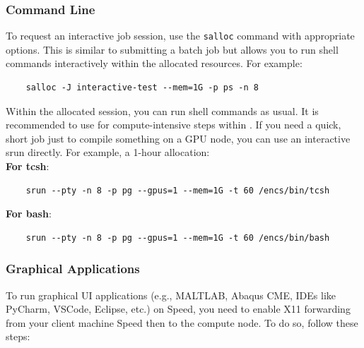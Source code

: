 \subsubsection{Command Line}
\label{sect:command-line}

To request an interactive job session, use the \texttt{salloc} command with appropriate options.
This is similar to submitting a batch job but allows you to run shell commands interactively 
within the allocated resources. For example:
\begin{verbatim}
	salloc -J interactive-test --mem=1G -p ps -n 8
\end{verbatim}

Within the allocated  session, you can run shell commands as usual. 
It is recommended to use  for compute-intensive steps within . 
If you need a quick, short job just to compile something on a GPU node, 
you can use an interactive srun directly. For example, a 1-hour allocation:\\

\noindent \textbf{For tcsh}:
\begin{verbatim}
	srun --pty -n 8 -p pg --gpus=1 --mem=1G -t 60 /encs/bin/tcsh
\end{verbatim}

\noindent \textbf{For bash}:
\begin{verbatim}
	srun --pty -n 8 -p pg --gpus=1 --mem=1G -t 60 /encs/bin/bash
\end{verbatim}

\subsubsection{Graphical Applications}
\label{sect:graphical-applications}

To run graphical UI applications (e.g., MALTLAB, Abaqus CME, IDEs like PyCharm, VSCode, Eclipse, etc.) on Speed, 
you need to enable X11 forwarding from your client machine Speed then to the compute node.
To do so, follow these steps:

